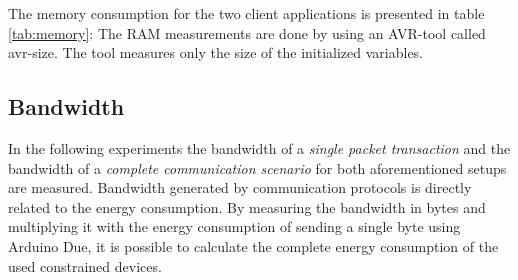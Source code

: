 The memory consumption for the two client applications is presented in table \ref{tab:memory}:
The RAM measurements are done by using an AVR-tool called avr-size. The tool measures only the size of the initialized variables.

\subsection{Bandwidth}
In the following experiments the bandwidth of a \emph{single packet transaction} and the bandwidth of a \emph{complete communication scenario} for both aforementioned setups are measured. 
Bandwidth generated by communication protocols is directly related to the energy consumption. By measuring the bandwidth in bytes and multiplying it with the energy consumption of sending a single byte using Arduino Due, it is possible to calculate the complete energy consumption of the used constrained devices. 

